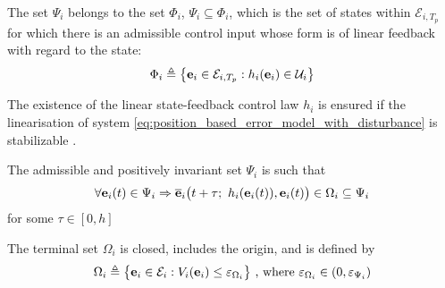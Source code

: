 \begin{bw_box}
  \begin{assumption}
  The set $\Psi_i$ belongs to the set $\Phi_i$, $\Psi_i \subseteq \Phi_i$,
  which is the set of states within $\mathcal{E}_{i,T_p}$ for which there is an
  admissible control input whose form is of linear feedback with regard to the
  state:
  \begin{align}
    \Phi_i \triangleq \big\{\bm{\mathbf{e}}_i \in \mathcal{E}_{i,T_p} : h_i(\bm{\mathbf{e}}_i) \in \mathcal{U}_i \big\}
  \end{align}
  \label{ass:phi_psi}
  \end{assumption}
\end{bw_box}

\begin{bw_box}
  \begin{remark}
    The existence of the linear state-feedback control law $h_i$ is ensured if
    the linearisation of system \eqref{eq:position_based_error_model_with_disturbance}
    is stabilizable \cite{262032}\cite{FINDEISEN2003190}.
    \label{remark:aux_control_stabilizability}
  \end{remark}
\end{bw_box}


\begin{bw_box}
  \begin{assumption}
  \label{ass:psi_omega}
  The admissible and positively invariant set $\Psi_i$ is such that
  \begin{align}
  \forall \bm{\mathbf{e}}_i(t) \in \Psi_i \Rightarrow \overline{\bm{\mathbf{e}}}_i\big(t+\tau;\ h_i(\bm{\mathbf{e}}_i(t)), \bm{\mathbf{e}}_i(t)\big) \in \Omega_i \subseteq \Psi_i
  \end{align}
  for some $\tau \in [0,h]$
  \end{assumption}
\end{bw_box}

\begin{bw_box}
  \begin{assumption}
  \label{ass:omega}
  The terminal set $\Omega_i$ is closed, includes the origin, and is defined by
  \begin{align}
    \Omega_i \triangleq \big\{\bm{\mathbf{e}}_i \in \mathcal{E}_i : V_i(\bm{\mathbf{e}}_i)
      \leq \varepsilon_{\Omega_i}\big\}\ \text{, where } \varepsilon_{\Omega_i} \in (0, \varepsilon_{\Psi_i})
  \end{align}
  \end{assumption}
\end{bw_box}

